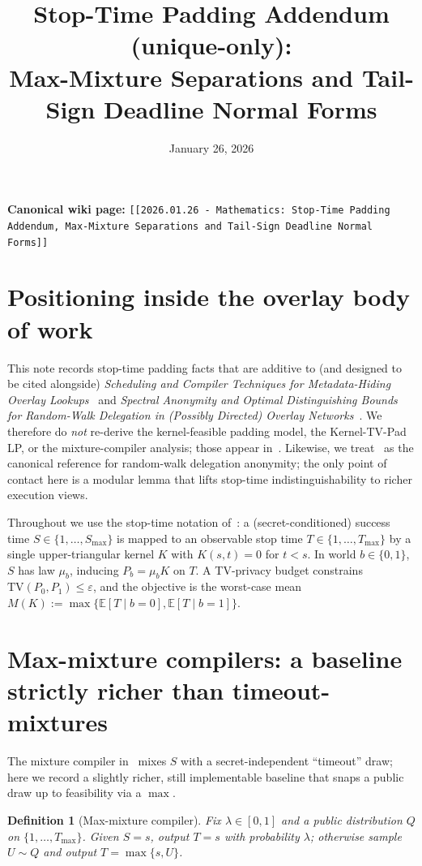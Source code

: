 \documentclass[11pt]{article}
\title{Stop-Time Padding Addendum (unique-only):\\
Max-Mixture Separations and Tail-Sign Deadline Normal Forms}
\author{}
\date{January 26, 2026}
\newtheorem{definition}[theorem]{Definition}
\theoremstyle{remark}
\newcommand{\TV}{\mathrm{TV}}
\newcommand{\E}{\mathbb{E}}
\begin{document}
\maketitle

\noindent\textbf{Canonical wiki page:} \texttt{[[2026.01.26 - Mathematics: Stop-Time Padding Addendum, Max-Mixture Separations and Tail-Sign Deadline Normal Forms]]}\\


\section*{Positioning inside the overlay body of work}
This note records stop-time padding facts that are additive to (and designed to be cited alongside)
\emph{Scheduling and Compiler Techniques for Metadata-Hiding Overlay Lookups}~\cite{sched} and
\emph{Spectral Anonymity and Optimal Distinguishing Bounds for Random-Walk Delegation in (Possibly Directed) Overlay Networks}~\cite{spectral}.
We therefore do \emph{not} re-derive the kernel-feasible padding model, the Kernel-TV-Pad LP, or the mixture-compiler analysis; those appear in~\cite{sched}.
Likewise, we treat~\cite{spectral} as the canonical reference for random-walk delegation anonymity; the only point of contact here is a modular lemma
that lifts stop-time indistinguishability to richer execution views.

Throughout we use the stop-time notation of~\cite{sched}:
a (secret-conditioned) success time $S\in\{1,\dots,S_{\max}\}$ is mapped to an observable stop time $T\in\{1,\dots,T_{\max}\}$ by a single upper-triangular
kernel $K$ with $K(s,t)=0$ for $t<s$.
In world $b\in\{0,1\}$, $S$ has law $\mu_b$, inducing $P_b=\mu_b K$ on $T$.
A TV-privacy budget constrains $\TV(P_0,P_1)\le \varepsilon$, and the objective is the worst-case mean
$M(K):=\max\{\E[T\mid b=0],\E[T\mid b=1]\}$.


\section{Max-mixture compilers: a baseline strictly richer than timeout-mixtures}
The mixture compiler in~\cite{sched} mixes $S$ with a secret-independent ``timeout'' draw; here we record a slightly richer, still implementable
baseline that snaps a public draw up to feasibility via a $\max$.

\begin{definition}[Max-mixture compiler]\label{def:maxmix}
Fix $\lambda\in[0,1]$ and a public distribution $Q$ on $\{1,\dots,T_{\max}\}$.
Given $S=s$, output $T=s$ with probability $\lambda$; otherwise sample $U\sim Q$ and output $T=\max\{s,U\}$.
\end{definition}
\end{document}
